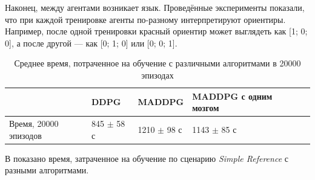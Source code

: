 Наконец, между агентами возникает язык. Проведённые эксперименты показали, что при каждой тренировке агенты по-разному интерпретируют ориентиры. Например, после одной тренировки красный ориентир может выглядеть как [1; 0; 0], а после другой --- как [0; 1; 0] или [0; 0; 1].

\begin{table}[t!]
	\centering\small
	\caption{Среднее время, потраченное на обучение с различными алгоритмами в 20000 эпизодах}
	\label{tab-sr-time}
	\begin{tabular}{|l|l|l|l|l|l|}
		\hline
		&DDPG&MADDPG&MADDPG с одним мозгом\\
		\hline
		Время, 20000 эпизодов & 845 $\pm$ 58 с & 1210 $\pm$ 98 с & 1143 $\pm$ 85 с\\ \hline
	\end{tabular}
	\normalsize%
\end{table}

В  показано время, затраченное на обучение по сценарию \textit{Simple Reference} с разными алгоритмами.